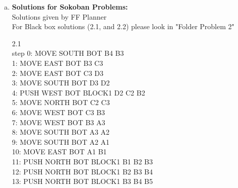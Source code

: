 \documentclass[]{article}
\begin{document}
	\begin{enumerate}[(a)]
		\item \textbf{Solutions for Sokoban Problems:}\\
		Solutions given by FF Planner\\
		For Black box solutions (2.1, and 2.2) please look in "Folder Problem 2"
		
		2.1\\
		step    0: MOVE SOUTH BOT B4 B3\\
		        1: MOVE EAST BOT B3 C3\\
		        2: MOVE EAST BOT C3 D3\\
		        3: MOVE SOUTH BOT D3 D2\\
		        4: PUSH WEST BOT BLOCK1 D2 C2 B2\\
		        5: MOVE NORTH BOT C2 C3\\
		        6: MOVE WEST BOT C3 B3\\
		        7: MOVE WEST BOT B3 A3\\
		        8: MOVE SOUTH BOT A3 A2\\
		        9: MOVE SOUTH BOT A2 A1\\
		       10: MOVE EAST BOT A1 B1\\
		       11: PUSH NORTH BOT BLOCK1 B1 B2 B3\\
		       12: PUSH NORTH BOT BLOCK1 B2 B3 B4\\
		       13: PUSH NORTH BOT BLOCK1 B3 B4 B5\\
		

\end{enumerate}
\end{document}
